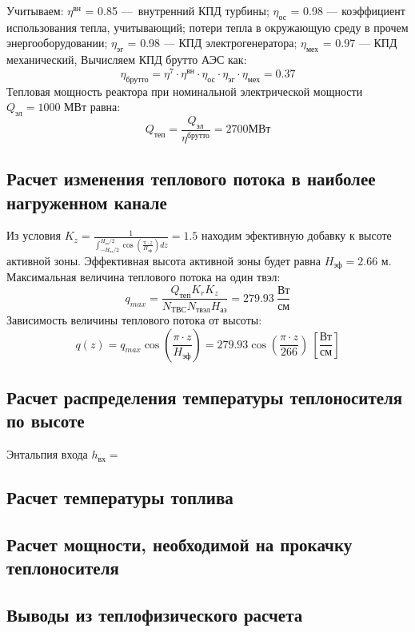 Учитываем:
$\eta^{\text{вн}}$ = 0.85 — внутренний КПД турбины;
$\eta_{\text{ос}}$ = 0.98 — коэффициент использования тепла, учитывающий; потери тепла в окружающую среду в прочем энергооборудовании;
$\eta_{\text{эг}}$ = 0.98 — КПД электрогенератора;
$\eta_{\text{мех}}$ = 0.97 — КПД механический,
Вычисляем КПД брутто АЭС как:
$$
\eta_{\text{брутто}} = \eta^7 \cdot \eta^{\text{вн}} \cdot \eta_{\text{ос}} \cdot \eta_{\text{эг}} \cdot \eta_{\text{мех}} = 0.37
$$
Тепловая мощность реактора при номинальной электрической мощности $Q_{\text{эл}} = 1000$ МВт равна:
$$
Q_{\text{теп}} = \frac {Q_{\text{эл}}} {\eta^{\text{брутто}}} = 2700 МВт 
$$


\subsection{Расчет изменения теплового потока в наиболее нагруженном канале}
Из условия $K_z = \frac 1 {\int_{-H_{\text{аз}}/2}^{H_{\text{аз}}/2} \cos \left( \frac {\pi \cdot z} {H_{\text{эф}}}\right)dz} = 1.5$ находим эфективную добавку к высоте активной зоны. Эффективная высота активной зоны будет равна $H_{\text{эф}} = 2.66$ м. Максимальная величина теплового потока на один твэл:
$$
q_{max} = \frac {Q_{\text{теп}}K_r K_z}{N_{ТВС}N_{\text{твэл}}H_{\text{аз}}} = 279.93\  \frac {\text{Вт}} {\text{см}}
$$ Зависимость величины теплового потока от высоты:
$$
q(z) = q_{max}\cos\left(\frac {\pi\cdot z} {H_{\text{эф}}}\right) = 279.93 \cos \left(\frac {\pi \cdot z} {266} \right)\ \left[\frac{\text{Вт}}{\text{см}} \right]
$$

\subsection{Расчет распределения температуры теплоносителя по высоте}
Энтальпия входа $h_{\text{вх}} = $

\subsection{Расчет температуры топлива}

\subsection{Расчет мощности, необходимой на прокачку теплоносителя}


\subsection{Выводы из теплофизического расчета}


